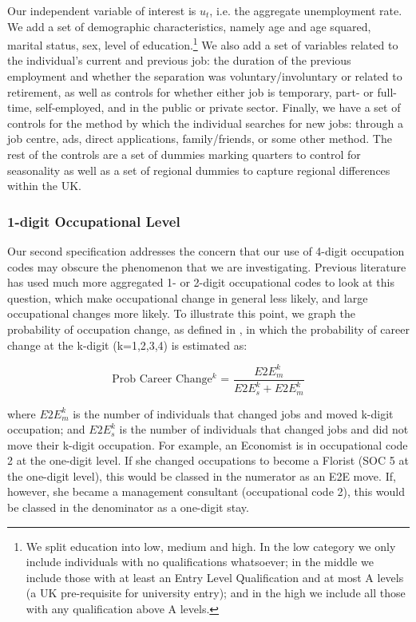 \documentclass[11pt, oneside]{article}
\begin{document}
\vspace{2mm}

Our independent variable of interest is $u_{t}$, i.e. the aggregate unemployment rate. We add a set of demographic characteristics, namely age and age squared, marital status, sex, level of education.\footnote{We split education into low, medium and high. In the low category we only include individuals with no qualifications whatsoever; in the middle we include those with at least an Entry Level Qualification and at most A levels (a UK pre-requisite for university entry); and in the high we include all those with any qualification above A levels.} We also add a set of variables related to the individual's current and previous job: the duration of the previous employment and whether the separation was voluntary/involuntary or related to retirement, as well as controls for whether either job is temporary, part- or full-time, self-employed, and in the public or private sector. Finally, we have a set of controls for the method by which the individual searches for new jobs: through a job centre, ads, direct applications, family/friends, or some other method. The rest of the controls are a set of dummies marking quarters to control for seasonality as well as a set of regional dummies to capture regional differences within the UK.

\subsubsection{1-digit Occupational Level}

Our second specification addresses the concern that our use of 4-digit occupation codes may obscure the phenomenon that we are investigating. Previous literature has used much more aggregated 1- or 2-digit occupational codes to look at this question, which make occupational change in general less likely, and large occupational changes more likely. To illustrate this point, we graph the probability of occupation change, as defined in \cite{Carrillo-Tudela2016}, in which the probability of career change at the k-digit (k=1,2,3,4) is estimated as:

\begin{equation*}
\text{Prob Career Change$^{k}$ = } \frac{E2E^{k}_m}{E2E^{k}_s + E2E^{k}_m}
\end{equation*}

\noindent where $E2E^{k}_m$ is the number of individuals that changed jobs and moved k-digit occupation; and $E2E^{k}_s$ is the number of individuals that changed jobs and did not move their k-digit occupation. For example, an Economist is in occupational code 2 at the one-digit level. If she changed occupations to become a Florist (SOC 5 at the one-digit level), this would be classed in the numerator as an E2E move. If, however, she became a management consultant (occupational code 2), this would be classed in the denominator as a one-digit stay.
\end{document}
